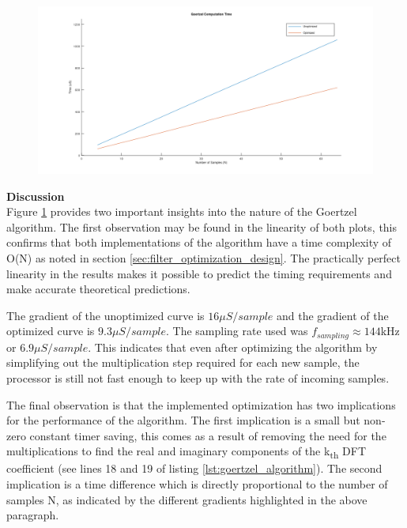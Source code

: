 \begin{figure}[H]
	\centering
	\includegraphics[width=\linewidth]{figures/results/goertzel_filter_speed/goertzel_computation_time.png}
	\label{fig:goertzel_computation_plot}
\end{figure}


\textbf{Discussion}\\
Figure \ref{fig:goertzel_computation_plot} provides two important insights into the nature of the Goertzel algorithm. The first observation may be found in the linearity of both plots, this confirms that both implementations of the algorithm have a time complexity of O(N) as noted in section \ref{sec:filter_optimization_design}. The practically perfect linearity in the results makes it possible to predict the timing requirements and make accurate theoretical predictions.

The gradient of the unoptimized curve is $16\mu S/sample$ and the gradient of the optimized curve is $9.3\mu S/sample$. The sampling rate used was $f_{sampling} \approx 144$kHz or $6.9\mu S/sample$. This indicates that even after optimizing the algorithm by simplifying out the multiplication step required for each new sample, the processor is still not fast enough to keep up with the rate of incoming samples.

The final observation is that the implemented optimization has two implications for the performance of the algorithm. The first implication is a small but non-zero constant timer saving, this comes as a result of removing the need for the multiplications to find the real and imaginary components of the k\textsubscript{th} DFT coefficient (see lines 18 and 19 of listing \ref{lst:goertzel_algorithm}). The second implication is a time difference which is directly proportional to the number of samples N, as indicated by the different gradients highlighted in the above paragraph.



